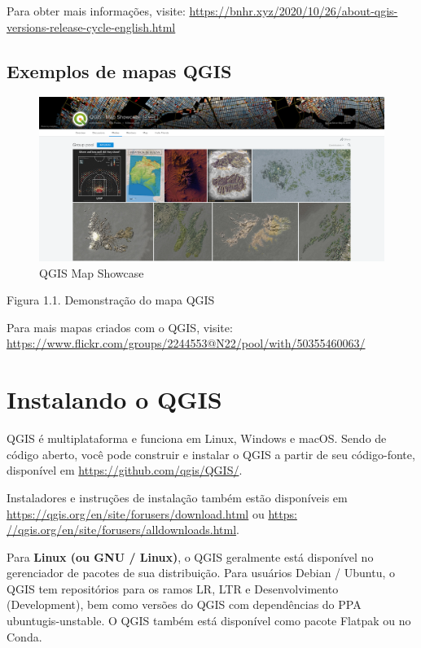 \documentclass[
]{krantz}
\begin{document}
Para obter mais informações, visite: \href{https://bnhr.xyz/2020/10/26/\%20about-qgis-versions-release-cycle-english.html}{https://bnhr.xyz/2020/10/26/about-qgis-versions-release-cycle-english.html}

\hypertarget{exemplos-de-mapas-qgis}{%
\subsection{Exemplos de mapas QGIS}\label{exemplos-de-mapas-qgis}}

\begin{figure}
\centering
\includegraphics{media/modulo1/qgis-map-showcase.png}
\caption{QGIS Map Showcase}
\end{figure}

Figura 1.1. Demonstração do mapa QGIS

Para mais mapas criados com o QGIS, visite: \href{https://www.flickr.com/groups/2244553@N22/\%20piscina/com/50355460063/}{https://www.flickr.com/groups/2244553@N22/pool/with/50355460063/}

\hypertarget{instalando-o-qgis}{%
\section{Instalando o QGIS}\label{instalando-o-qgis}}

QGIS é multiplataforma e funciona em Linux, Windows e macOS. Sendo de código aberto, você pode construir e instalar o QGIS a partir de seu código-fonte, disponível em \url{https://github.com/qgis/QGIS/}.

Instaladores e instruções de instalação também estão disponíveis em \url{https://qgis.org/en/site/forusers/download.html} ou \href{https://qgis.org/en/site/forusers/alldownloads.html}{https: //qgis.org/en/site/forusers/alldownloads.html}.

Para \textbf{Linux (ou GNU / Linux)}, o QGIS geralmente está disponível no gerenciador de pacotes de sua distribuição. Para usuários Debian / Ubuntu, o QGIS tem repositórios para os ramos LR, LTR e Desenvolvimento (Development), bem como versões do QGIS com dependências do PPA ubuntugis-unstable. O QGIS também está disponível como pacote Flatpak ou no Conda.
\end{document}
